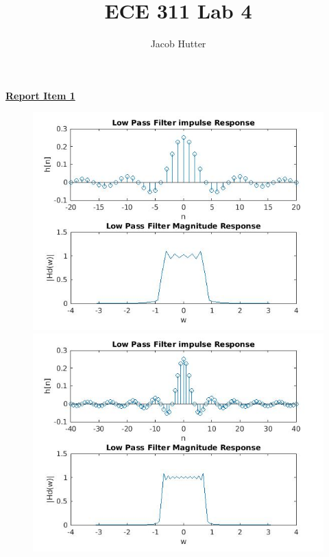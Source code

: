 \documentclass{article}
\author{Jacob Hutter}
\title{ECE 311 Lab 4}
\begin{document}
\maketitle
\color{red}
\underline{\textbf{Report Item 1}}
\color{black}

\begin{figure}[H]
\includegraphics[scale = .5]{1_lpf_20}
\includegraphics[scale = .5]{1_lpf_40}
\end{figure}
\end{document}
